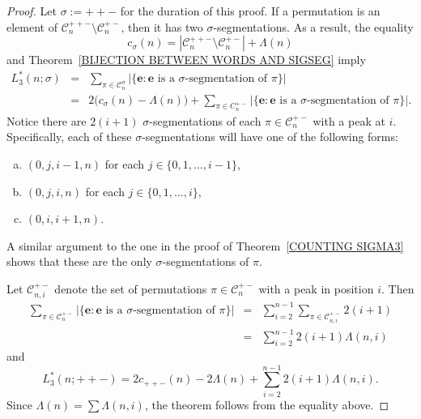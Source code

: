 \documentclass[12pt]{article}
\newcommand{\C}{\mathcal{C}}
\newcommand{\e}{\mathbf{e}}
\theoremstyle{plain}
\theoremstyle{definition}
\begin{document}
\begin{proof}
Let $\sigma:=++-$ for the duration of this proof. If a permutation is an element of $\mathcal C_n^{++-}\setminus \C_n^{+-}$, then it has two $\sigma$-segmentations.  As a result, the equality
	\[c_{\sigma}(n) = |\mathcal C_n^{++-}\setminus \C_n^{+-}|+\Lambda(n)\]
and Theorem~\ref{BIJECTION BETWEEN WORDS AND SIGSEG} imply
	\begin{eqnarray*}
		L_3^*(n;\sigma) & = & \sum_{\pi \in\mathcal C_n^{\sigma}} |\{\e: \e\text{ is a }\sigma\text{-segmentation of } \pi\}|  \\
			& = & 2\big(c_{\sigma}(n)-\Lambda(n)\big) + \sum_{\pi \in C_n^{+-}} |\{\e: \e\text{ is a }\sigma\text{-segmentation of } \pi\}|.
	\end{eqnarray*}
Notice there are $2(i+1)$ $\sigma$-segmentations of each $\pi \in \C_n^{+-}$ with a peak at $i$.  Specifically, each of these $\sigma$-segmentations will have one of the following forms:
	\begin{enumerate}[(a)]
		\item $(0, j, i-1, n)$ for each $j \in \{0,1,\ldots,i-1\}$,
		\item $(0, j, i, n)$ for each $j \in \{0,1,\ldots,i\}$,
		\item $(0, i, i+1, n)$.
	\end{enumerate} 
A similar argument to the one in the proof of Theorem~\ref{COUNTING SIGMA3} shows that these are the only $\sigma$-segmentations of $\pi$.

Let $\C_{n,i}^{+-}$ denote the set of permutations $\pi \in \C_n^{+-}$ with a peak in position $i$. Then
	\begin{eqnarray*}\sum_{\pi \in \C_n^{+-}} |\{\e: \e\text{ is a }\sigma\text{-segmentation of }\pi\}| & =&   \sum_{i=2}^{n-1}  \sum_{\pi \in \C_{n,i}^{+-}} 2(i+1)\\ &=&   \sum_{i=2}^{n-1}  2(i+1)\Lambda(n,i)\end{eqnarray*}
and
	\[L_3^*(n;++-) = 2c_{++-}(n)-2\Lambda(n)+\sum_{i=2}^{n-1}  2(i+1)\Lambda(n,i).\]
Since $\Lambda(n) = \sum \Lambda(n,i)$,  the theorem follows from the equality above.
\end{proof}
\end{document}

